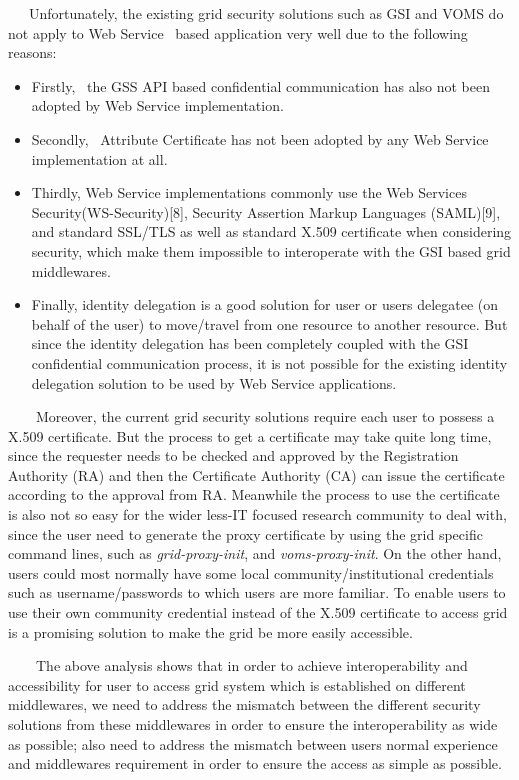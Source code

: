 \documentclass{article}
\newcommand\liststyleLii{%
\renewcommand\labelitemi{${\bullet}$}
\renewcommand\labelitemii{${\circ}$}
\renewcommand\labelitemiii{${\blacksquare}$}
\renewcommand\labelitemiv{${\bullet}$}
}
\begin{document}
\ \ \ Unfortunately, the existing grid security solutions such as GSI
and VOMS do not apply to Web Service \ based application very well due
to the following reasons:

\liststyleLii
\begin{itemize}
\item Firstly, \ the GSS API based confidential communication has also
not been adopted by Web Service implementation.
\item Secondly, \ Attribute Certificate has not been adopted by any Web
Service implementation at all.
\item Thirdly, Web Service implementations commonly use the Web Services
Security(WS-Security)[8], Security Assertion Markup Languages
(SAML)[9], and standard SSL/TLS as well as standard X.509 certificate
when considering security, which make them impossible to interoperate
with the GSI based grid middlewares.
\item Finally, identity delegation is a good solution for user or
user{\textquotesingle}s delegatee (on behalf of the user) to
move/travel from one resource to another resource. But since the
identity delegation has been completely coupled with the GSI
confidential communication process, it is not possible for the existing
identity delegation solution to be used by Web Service applications.
\end{itemize}
\ \ \ \ Moreover, the current grid security solutions require each user
to possess a X.509 certificate. But the process to get a certificate
may take quite long time, since the requester needs to be checked and
approved by the Registration Authority (RA) and then the Certificate
Authority (CA) can issue the certificate according to the approval from
RA. Meanwhile the process to use the certificate is also not so easy
for the wider less-IT focused research community to deal with, since
the user need to generate the proxy certificate by using the grid
specific command lines, such as \textit{grid-proxy-init}, and
\textit{voms-proxy-init}. On the other hand, users could most normally
have some local community/institutional credentials such as
username/passwords to which users are more familiar. To enable users to
use their own community credential instead of the X.509 certificate to
access grid is a promising solution to make the grid be more easily
accessible. 

\ \ \ \ The above analysis shows that in order to achieve
interoperability and accessibility for user to access grid system which
is established on different middlewares, we need to address the
mismatch between the different security solutions from these
middlewares in order to ensure the interoperability as wide as
possible; also need to address the mismatch between
user{\textquotesingle}s normal experience and
middleware{\textquotesingle}s requirement in order to ensure the access
as simple as possible.
\end{document}
